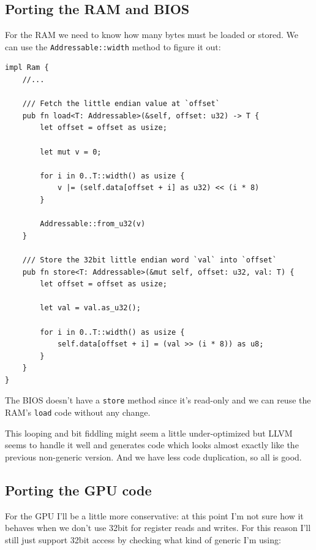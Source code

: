 \documentclass[a4paper]{article}
\newcommand{\code}[1] {\texttt{#1}}
\begin{document}
\subsection{Porting the RAM and BIOS}

For the RAM we need to know how many bytes must be loaded or
stored. We can use the \code{Addressable::width} method to figure it
out:

\begin{lstlisting}
impl Ram {
    //...

    /// Fetch the little endian value at `offset`
    pub fn load<T: Addressable>(&self, offset: u32) -> T {
        let offset = offset as usize;

        let mut v = 0;

        for i in 0..T::width() as usize {
            v |= (self.data[offset + i] as u32) << (i * 8)
        }

        Addressable::from_u32(v)
    }

    /// Store the 32bit little endian word `val` into `offset`
    pub fn store<T: Addressable>(&mut self, offset: u32, val: T) {
        let offset = offset as usize;

        let val = val.as_u32();

        for i in 0..T::width() as usize {
            self.data[offset + i] = (val >> (i * 8)) as u8;
        }
    }
}
\end{lstlisting}

The BIOS doesn't have a \code{store} method since it's read-only and
we can reuse the RAM's \code{load} code without any change.

This looping and bit fiddling might seem a little under-optimized but
LLVM seems to handle it well and generates code which looks almost
exactly like the previous non-generic version. And we have less code
duplication, so all is good.

\subsection{Porting the GPU code}

For the GPU I'll be a little more conservative: at this point I'm not
sure how it behaves when we don't use 32bit for register reads and
writes. For this reason I'll still just support 32bit access by
checking what kind of generic I'm using:
\end{document}
